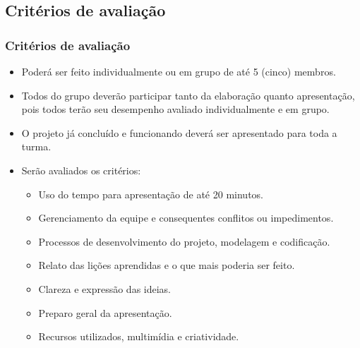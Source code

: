 \subsection[Critérios de avaliação]{Critérios de avaliação}\label{subsec:projetos-criterios}



  \begin{frame}[t]\frametitle{Critérios de avaliação}

    \begin{itemize}
      \justifying{}
      \setlength\itemsep{1em}
      \item Poderá ser feito individualmente ou em grupo de até 5 (cinco) membros.
      \item Todos do grupo deverão participar tanto da elaboração quanto apresentação, pois todos terão seu desempenho avaliado individualmente e em grupo.
      \item O projeto já concluído e funcionando deverá ser apresentado para toda a turma.
      \item Serão avaliados os critérios:
      \begin{itemize}
        \justifying{}
        \item Uso do tempo para apresentação de até 20 minutos.
        \item Gerenciamento da equipe e consequentes conflitos ou impedimentos.
        \item Processos de desenvolvimento do projeto, modelagem e codificação.
        \item Relato das lições aprendidas e o que mais poderia ser feito.
        \item Clareza e expressão das ideias.
        \item Preparo geral da apresentação.
        \item Recursos utilizados, multimídia e criatividade.
      \end{itemize}
    \end{itemize}

  \end{frame}



